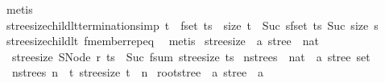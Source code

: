 \begin{isabellebody}
\ metis%
\endisatagproof
{\isafoldproof}%
%
\isadelimproof
\isanewline
%
\endisadelimproof
\isanewline
{}\isamarkupfalse%
\ stree{\isacharunderscore}{\kern0pt}size{\isacharunderscore}{\kern0pt}child{\isacharunderscore}{\kern0pt}lt{\isacharprime}{\kern0pt}{\isacharbrackleft}{\kern0pt}termination{\isacharunderscore}{\kern0pt}simp{\isacharbrackright}{\kern0pt}{\isacharcolon}{\kern0pt}\ {\isachardoublequoteopen}t\ {\isasymin}\ fset\ ts\ {\isasymLongrightarrow}\ size\ t\ {\isacharless}{\kern0pt}\ Suc\ {\isacharparenleft}{\kern0pt}{\isasymSum}s{\isasymin}fset\ ts{\isachardot}{\kern0pt}\ Suc\ {\isacharparenleft}{\kern0pt}size\ s{\isacharparenright}{\kern0pt}{\isacharparenright}{\kern0pt}{\isachardoublequoteclose}\isanewline
%
\isadelimproof
\ \ %
\endisadelimproof
%
\isatagproof
{}\isamarkupfalse%
\ stree{\isacharunderscore}{\kern0pt}size{\isacharunderscore}{\kern0pt}child{\isacharunderscore}{\kern0pt}lt\ fmember{\isachardot}{\kern0pt}rep{\isacharunderscore}{\kern0pt}eq\ \isamarkupfalse%
\ metis%
\endisatagproof
{\isafoldproof}%
%
\isadelimproof
\isanewline
%
\endisadelimproof
\isanewline
{}\isamarkupfalse%
\ stree{\isacharunderscore}{\kern0pt}size\ {\isacharcolon}{\kern0pt}{\isacharcolon}{\kern0pt}\ {\isachardoublequoteopen}{\isacharprime}{\kern0pt}a\ stree\ {\isasymRightarrow}\ nat{\isachardoublequoteclose}\ \isanewline
\ \ {\isachardoublequoteopen}stree{\isacharunderscore}{\kern0pt}size\ {\isacharparenleft}{\kern0pt}SNode\ r\ ts{\isacharparenright}{\kern0pt}\ {\isacharequal}{\kern0pt}\ Suc\ {\isacharparenleft}{\kern0pt}fsum\ stree{\isacharunderscore}{\kern0pt}size\ ts{\isacharparenright}{\kern0pt}{\isachardoublequoteclose}\isanewline
\isanewline
{}\isamarkupfalse%
\ n{\isacharunderscore}{\kern0pt}strees\ {\isacharcolon}{\kern0pt}{\isacharcolon}{\kern0pt}\ {\isachardoublequoteopen}nat\ {\isasymRightarrow}\ {\isacharprime}{\kern0pt}a\ stree\ set{\isachardoublequoteclose}\ \isanewline
\ \ {\isachardoublequoteopen}n{\isacharunderscore}{\kern0pt}strees\ n\ {\isacharequal}{\kern0pt}\ {\isacharbraceleft}{\kern0pt}t{\isachardot}{\kern0pt}\ stree{\isacharunderscore}{\kern0pt}size\ t\ {\isacharequal}{\kern0pt}\ n{\isacharbraceright}{\kern0pt}{\isachardoublequoteclose}\isanewline
\isanewline
{}\isamarkupfalse%
\ root{\isacharunderscore}{\kern0pt}stree\ {\isacharcolon}{\kern0pt}{\isacharcolon}{\kern0pt}\ {\isachardoublequoteopen}{\isacharprime}{\kern0pt}a\ stree\ {\isasymRightarrow}\ {\isacharprime}{\kern0pt}a{\isachardoublequoteclose}\ \isanewline

\end{isabellebody}
